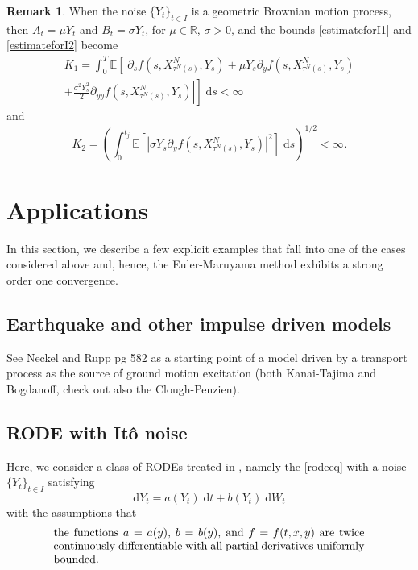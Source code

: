 \documentclass[reqno,12pt]{amsart}
\theoremstyle{plain}%
\theoremstyle{definition}
\newtheorem{rmk}{Remark}[section]
\begin{document}
\begin{rmk}
    When the noise $\{Y_t\}_{t\in I}$ is a geometric Brownian motion process, then $A_t = \mu  Y_t$ and $B_t = \sigma Y_t$, for $\mu\in \mathbb{R}$, $\sigma > 0$, and the bounds \eqref{estimateforI1} and \eqref{estimateforI2} become
    \begin{multline}
        K_1 = \int_0^{T}
        \mathbb{E}\left[\left|\partial_s f(s, X_{\tau^N(s)}^N, Y_s) + \mu Y_s \partial_y f(s, X_{\tau^N(s)}^N, Y_s) \right.\right. \\
        \left.\left. + \frac{\sigma^2 Y_s^2}{2}\partial_{yy}f(s, X_{\tau^N(s)}^N, Y_s) \right|\right] \;\mathrm{d}s < \infty
    \end{multline}
    and
    \begin{equation}
        K_2 = \left(\int_0^{t_j} \mathbb{E}\left[\left|\sigma Y_s \partial_y f(s, X_{\tau^N(s)}^N, Y_s)\right|^2\right] \;\mathrm{d}s\right)^{1/2} < \infty.
    \end{equation}
\end{rmk}

\section{Applications}

In this section, we describe a few explicit examples that fall into one of the cases considered above and, hence, the Euler-Maruyama method exhibits a strong order one convergence.

\subsection{Earthquake and other impulse driven models}

See Neckel and Rupp pg 582 as a starting point of a model driven by a transport process as the source of ground motion excitation (both Kanai-Tajima and Bogdanoff, check out also the Clough-Penzien).

\subsection{RODE with It\^o noise}

Here, we consider a class of RODEs treated in \cite[Chapter 3]{Asai2016}, namely the \eqref{rodeeq} with a noise $\{Y_t\}_{t\in I}$ satisfying
\begin{equation}
    \mathrm{d}Y_t = a(Y_t)\;\mathrm{d}t + b(Y_t)\;\mathrm{d}W_t
\end{equation}
with the assumptions that
\begin{equation}
    \label{itonoiseboundedderivativescondition}
    \parbox{0.8\textwidth}{the functions $a=a(y)$, $b=b(y)$, and $f=f(t, x, y)$ are twice continuously differentiable with all partial derivatives uniformly bounded.}
\end{equation}
\end{document}
